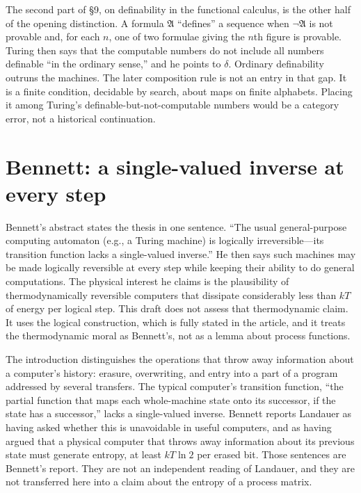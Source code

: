 \documentclass[12pt]{article}
\begin{document}
The second part of \S 9, on definability in the functional calculus, is the other half of the opening distinction. A formula $\mathfrak{A}$ ``defines'' a sequence when $\lnot\mathfrak{A}$ is not provable and, for each $n$, one of two formulae giving the $n$th figure is provable. Turing then says that the computable numbers do not include all numbers definable ``in the ordinary sense,'' and he points to $\delta$. Ordinary definability outruns the machines. The later composition rule is not an entry in that gap. It is a finite condition, decidable by search, about maps on finite alphabets. Placing it among Turing's definable-but-not-computable numbers would be a category error, not a historical continuation.

\section{Bennett: a single-valued inverse at every step}
\label{sec:bennett}

Bennett's abstract states the thesis in one sentence. ``The usual general-purpose computing automaton (e.g., a Turing machine) is logically irreversible---its transition function lacks a single-valued inverse.'' He then says such machines may be made logically reversible at every step while keeping their ability to do general computations. The physical interest he claims is the plausibility of thermodynamically reversible computers that dissipate considerably less than $kT$ of energy per logical step. This draft does not assess that thermodynamic claim. It uses the logical construction, which is fully stated in the article, and it treats the thermodynamic moral as Bennett's, not as a lemma about process functions.

The introduction distinguishes the operations that throw away information about a computer's history: erasure, overwriting, and entry into a part of a program addressed by several transfers. The typical computer's transition function, ``the partial function that maps each whole-machine state onto its successor, if the state has a successor,'' lacks a single-valued inverse. Bennett reports Landauer as having asked whether this is unavoidable in useful computers, and as having argued that a physical computer that throws away information about its previous state must generate entropy, at least $kT\ln 2$ per erased bit. Those sentences are Bennett's report. They are not an independent reading of Landauer, and they are not transferred here into a claim about the entropy of a process matrix.
\end{document}
